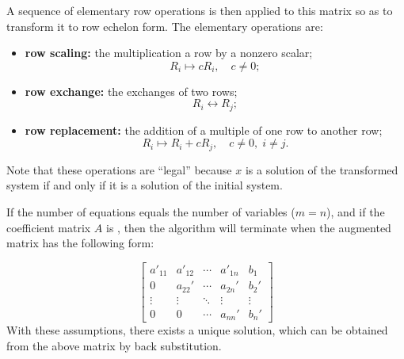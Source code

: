 \documentclass[12pt]{article}
\begin{document}
A sequence of elementary row operations is then applied to this matrix
so as to transform it to row echelon form. The elementary operations are:
\begin{itemize}
\item \textbf{row scaling:} the multiplication a row by a nonzero
  scalar;
\[ R_i \mapsto c R_i,\quad c\neq 0;\]
\item \textbf{row exchange:} the  exchanges of two rows;
  \[ R_i \leftrightarrow R_j;\]
\item \textbf{row replacement:} the  addition of a multiple of one row to
  another row;
  \[ R_i \mapsto R_i + c R_j,\quad c\neq 0,\; i\neq j.\]
\end{itemize}
Note that these operations are ``legal'' because $x$ is a solution of
the transformed system if and only if it is a solution of the initial system.

If the number of equations equals the number of variables ($m=n$), and
if the coefficient matrix $A$ is , then the algorithm will
terminate when the augmented matrix has the following form:

$$ \begin{bmatrix}
a'_{11} & a'_{12} & \cdots & a'_{1n} & b_1 \\
0 & a_{22}' & \cdots & a_{2n}' & b_2' \\
\vdots & \vdots & \ddots & \vdots & \vdots \\
0 & 0 & \cdots & a_{nn}' & b_n'
\end{bmatrix} $$
With these assumptions, there exists a unique solution, which can be
obtained from the above matrix by back substitution.



\end{document}
